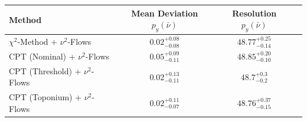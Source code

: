     \begin{tabular}{lccc}
        \toprule
        Method & Mean Deviation $p_{y}(\bar{\nu})$ & Resolution $p_{y}(\bar{\nu})$ \\
        \midrule
        $\chi^2$-Method + $\nu^2$-Flows & $0.02^{+0.08}_{-0.08}$ & $48.77^{+0.25}_{-0.14}$ \\
        CPT (Nominal) + $\nu^2$-Flows & $0.05^{+0.09}_{-0.11}$ & $48.85^{+0.20}_{-0.10}$ \\
        CPT (Threshold) + $\nu^2$-Flows & $0.02^{+0.13}_{-0.11}$ & $48.7^{+0.3}_{-0.2}$ \\
        CPT (Toponium) + $\nu^2$-Flows & $0.02^{+0.11}_{-0.07}$ & $48.76^{+0.37}_{-0.15}$ \\
        \bottomrule
    \end{tabular}